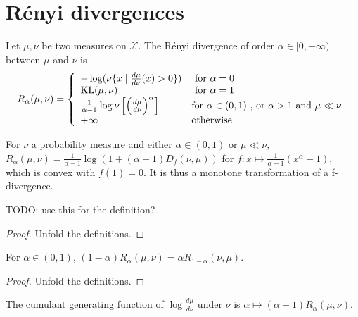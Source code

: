 \chapter{Rényi divergences}

\begin{definition}
  \label{def:Renyi}
  \leanok
  Let $\mu, \nu$ be two measures on $\mathcal X$. The Rényi divergence of order $\alpha \in [0,+\infty)$ between $\mu$ and $\nu$ is
  \begin{align*}
  R_\alpha(\mu, \nu) = \left\{
 \begin{array}{ll}
  - \log(\nu\{x \mid \frac{d \mu}{d \nu}(x) > 0\}) & \text{ for } \alpha = 0
  \\
  \mathrm{KL}(\mu, \nu) & \text{ for } \alpha = 1
  \\
  \frac{1}{\alpha - 1}\log \nu\left[\left(\frac{d \mu}{d \nu}\right)^\alpha\right] & \text {for } \alpha \in (0,1) \text{ , or } \alpha > 1 \text{ and }\mu \ll \nu
  \\
  +\infty & \text {otherwise}
  \end{array}\right.
  \end{align*}
\end{definition}

\begin{lemma}
  \label{lem:renyi_eq_log_fDiv}
  For $\nu$ a probability measure and either $\alpha \in (0,1)$ or $\mu \ll \nu$, $R_\alpha(\mu, \nu) = \frac{1}{\alpha - 1} \log (1 + (\alpha - 1) D_f(\nu, \mu))$ for $f : x \mapsto \frac{1}{\alpha - 1}(x^{\alpha} - 1)$, which is convex with $f(1)=0$. It is thus a monotone transformation of a f-divergence.

  TODO: use this for the definition?
\end{lemma}

\begin{proof}
Unfold the definitions.
\end{proof}

\begin{lemma}
  \label{lem:renyi_symm}
  For $\alpha \in (0, 1)$, $(1 - \alpha) R_\alpha(\mu, \nu) = \alpha R_{1 - \alpha}(\nu, \mu)$.
\end{lemma}

\begin{proof}
Unfold the definitions.
\end{proof}

\begin{lemma}
  \label{lem:renyi_cgf}
  The cumulant generating function of $\log\frac{d\mu}{d\nu}$ under $\nu$ is $\alpha \mapsto (\alpha - 1) R_\alpha(\mu, \nu)$.
\end{lemma}

